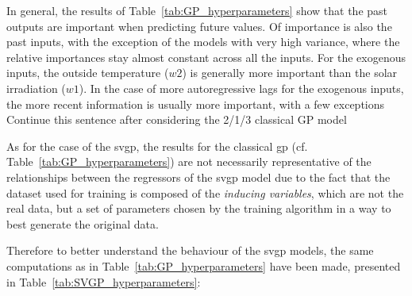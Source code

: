 In general, the results of Table~\ref{tab:GP_hyperparameters} show that the
past outputs are important when predicting future values. Of importance is also
the past inputs, with the exception of the models with very high variance, where
the relative importances stay almost constant across all the inputs. For the
exogenous inputs, the outside temperature ($w2$) is generally more important
than the solar irradiation ($w1$). In the case of more autoregressive lags for
the exogenous inputs, the more recent information is usually more important,
with a few exceptions {\color{red} Continue this sentence after considering the
2/1/3 classical GP model}



As for the case of the \acrlong{svgp}, the results for the classical
\acrshort{gp} (cf. Table~\ref{tab:GP_hyperparameters}) are not necessarily
representative of the relationships between the regressors of the
\acrshort{svgp} model due to the fact that the dataset used for training is
composed of the \textit{inducing variables}, which are not the real data, but a
set of parameters chosen by the training algorithm in a way to best generate the
original data.

Therefore to better understand the behaviour of the \acrshort{svgp} models, the
same computations as in Table~\ref{tab:GP_hyperparameters} have been made,
presented in Table~\ref{tab:SVGP_hyperparameters}:

